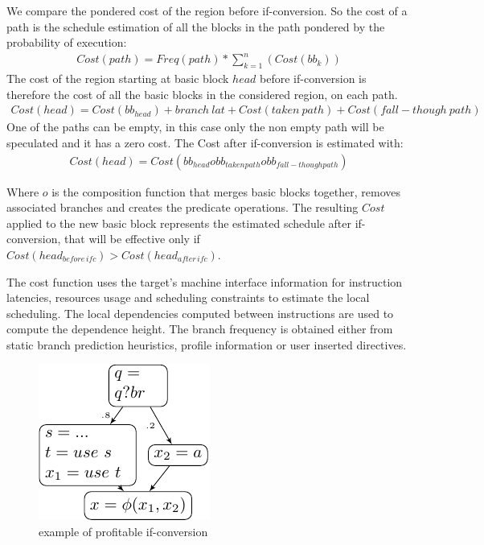 We compare the pondered cost of the region before if-conversion. So the cost of a path is the schedule estimation of all the blocks in the path pondered by the probability of execution:
\begin{align}
Cost(path)=Freq(path)*\sum_{k=1}^n(Cost(bb_{k}))
\end{align}
The cost of the region starting at basic block $head$ before if-conversion is therefore the cost of all the basic blocks in the considered region, on each path.
\begin{align}
Cost(head)=Cost(bb_{head})+branch\:lat+Cost(taken\:path)+Cost(fall-though\:path)
\end{align}
One of the paths can be empty, in this case only the non empty path will be speculated and it has a zero cost. The Cost after if-conversion is estimated with:
\begin{align}
Cost(head)=Cost(bb_{head} o bb_{taken path} o bb_{fall-though path})
\end{align}

Where $o$ is the composition function that merges basic blocks together, removes associated branches and creates the predicate operations. The resulting $Cost$ applied to the new basic block represents the estimated schedule after if-conversion, that will be effective only if $Cost(head_{before\,ifc}) > Cost(head_{after\,ifc})$. 
 
The cost function uses the target's machine interface information for instruction latencies, resources usage and scheduling constraints to estimate the local scheduling. The local dependencies computed between instructions are used to compute the dependence height. The branch frequency is obtained either from static branch prediction heuristics, profile information or user inserted directives.
\begin{figure}
    \includegraphics[scale=0.8]{ssa_freq}
\caption{example of profitable if-conversion}
\label{fig:ssa_freq}
\end{figure}

